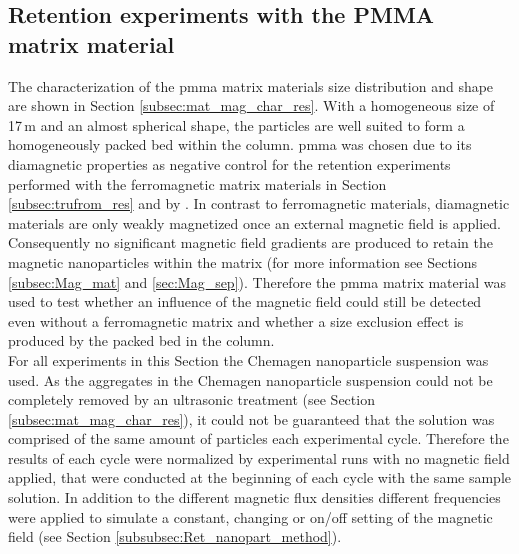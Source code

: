 %         



\subsection{Retention experiments with the PMMA matrix material}
\label{subsec:pmma_res}
The characterization of the \gls{pmma} matrix materials size distribution and shape are shown in Section \ref{subsec:mat_mag_char_res}. With a homogeneous size of 17\,\textmu m and an almost spherical shape, the particles are well suited to form a homogeneously packed bed within the column. \gls{pmma} was chosen due to its diamagnetic properties as negative control for the retention experiments performed with the ferromagnetic matrix materials in Section\,\ref{subsec:trufrom_res} and by \cite{AndreMaster}. In contrast to ferromagnetic materials, diamagnetic materials are only weakly magnetized once an external magnetic field is applied. Consequently no significant magnetic field gradients are produced to retain the magnetic nanoparticles within the matrix (for more information see Sections\,\ref{subsec:Mag_mat} and \ref{sec:Mag_sep}). Therefore the \gls{pmma} matrix material was used to test whether an influence of the magnetic field could still be detected even without a ferromagnetic matrix and whether a size exclusion effect is produced by the packed bed in the column. \\
For all experiments in this Section the Chemagen nanoparticle suspension was used. 
As the aggregates in the Chemagen nanoparticle suspension could not be completely removed by an ultrasonic treatment (see Section \ref{subsec:mat_mag_char_res}), it could not be guaranteed that the solution was comprised of the same amount of particles each experimental cycle. Therefore the results of each cycle were normalized by experimental runs with no magnetic field applied, that were conducted at the beginning of each cycle with the same sample solution. In addition to the different magnetic flux densities different frequencies were applied to simulate a constant, changing or on/off setting of the magnetic field (see Section \ref{subsubsec:Ret_nanopart_method}). 

